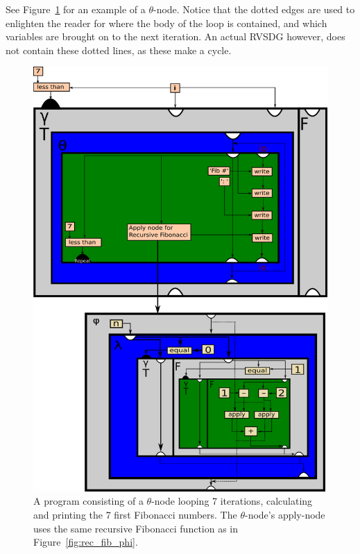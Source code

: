 \begin{itemize}
See Figure~\ref{fig:for_loop_rec_fib_print_ex} for an example of a
$\theta$-node. Notice that the dotted edges are used to enlighten the reader for
where the body of the loop is contained, and which variables are brought on to
the next iteration. An actual RVSDG however, does not contain these dotted
lines, as these make a cycle.


\clearpage
\begin{figure}[ht!]
	\centering
	\includegraphics[width=\textwidth]{figures/for-loop-printf-rec_fib-example}
	\caption{A program consisting of a $\theta$-node looping 7 iterations,
calculating and printing the 7 first Fibonacci numbers. The $\theta$-node's
apply-node uses the same recursive Fibonacci function as in
Figure~\ref{fig:rec_fib_phi}.}
	\label{fig:for_loop_rec_fib_print_ex}
\end{figure}


\end{itemize}
